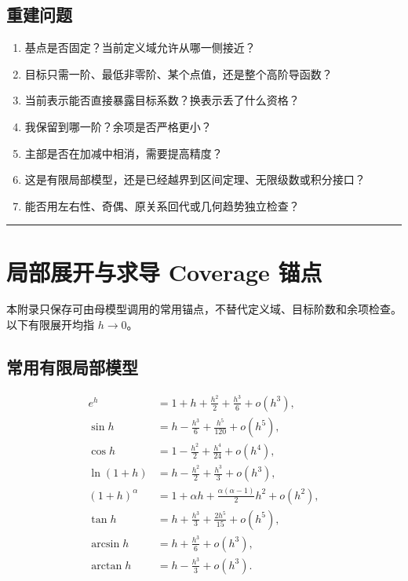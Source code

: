 \documentclass[11pt,a4paper]{ctexart}
\begin{document}
\subsection{重建问题}
\begin{enumerate}
  \item 基点是否固定？当前定义域允许从哪一侧接近？
  \item 目标只需一阶、最低非零阶、某个点值，还是整个高阶导函数？
  \item 当前表示能否直接暴露目标系数？换表示丢了什么资格？
  \item 我保留到哪一阶？余项是否严格更小？
  \item 主部是否在加减中相消，需要提高精度？
  \item 这是有限局部模型，还是已经越界到区间定理、无限级数或积分接口？
  \item 能否用左右性、奇偶、原关系回代或几何趋势独立检查？
\end{enumerate}

\begin{center}\rule{0.5\linewidth}{0.5pt}\end{center}

\appendix
\section{局部展开与求导 Coverage 锚点}

本附录只保存可由母模型调用的常用锚点，不替代定义域、目标阶数和余项检查。以下有限展开均指 $h\to0$。

\subsection{常用有限局部模型}

\[
\begin{aligned}
e^h&=1+h+\frac{h^2}{2}+\frac{h^3}{6}+o(h^3),\\
\sin h&=h-\frac{h^3}{6}+\frac{h^5}{120}+o(h^5),\\
\cos h&=1-\frac{h^2}{2}+\frac{h^4}{24}+o(h^4),\\
\ln(1+h)&=h-\frac{h^2}{2}+\frac{h^3}{3}+o(h^3),\\
{(1+h)}^\alpha&=1+\alpha h+\frac{\alpha(\alpha-1)}{2}h^2+o(h^2),\\
\tan h&=h+\frac{h^3}{3}+\frac{2h^5}{15}+o(h^5),\\
\arcsin h&=h+\frac{h^3}{6}+o(h^3),\\
\arctan h&=h-\frac{h^3}{3}+o(h^3).
\end{aligned}
\]
\end{document}
